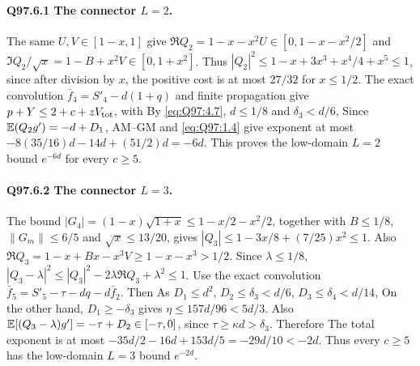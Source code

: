 \paragraph{Q97.6.1 The connector \(L=\allowbreak 2\).}
The same \(U,\allowbreak V\in[1-x,\allowbreak 1]\) give
\(\Re Q_2=\allowbreak 1-x-x^2U\in[0,\allowbreak 1-x-x^2/2]\) and
\(\Im Q_2/\sqrt x=\allowbreak 1-B+x^2V\in[0,\allowbreak 1+x^2]\).
Thus \(|Q_2|^2\le\allowbreak 1-x+3x^3+x^4/4+x^5\le\allowbreak 1\), since after division
by \(x\), the positive cost is at most \(27/32\) for \(x\le\allowbreak 1/2\).
The exact convolution \(\bar f_4=\allowbreak S'_4-d(1+q)\) and finite propagation
give \(p+Y\le\allowbreak 2+c+zV_{\rm tot}\), with
By \eqref{eq:Q97:4.7}, \(d\le\allowbreak 1/8\) and \(\delta_3<\allowbreak d/6\),
Since \(\mathbb E(Q_2g')=\allowbreak -d+D_1\),
AM--GM and \eqref{eq:Q97:1.4} give exponent at most
\(-8(35/16)d-14d+(51/2)d=\allowbreak -6d\).
This proves the low-domain \(L=\allowbreak 2\) bound \(e^{-6d}\) for every \(c\ge\allowbreak 5\).

\paragraph{Q97.6.2 The connector \(L=\allowbreak 3\).}
The bound \(|G_4|=\allowbreak (1-x)\sqrt{1+x}\le\allowbreak 1-x/2-x^2/2\), together with
\(B\le\allowbreak 1/8\), \(\|G_m\|\le\allowbreak 6/5\) and \(\sqrt x\le\allowbreak 13/20\), gives
\(|Q_3|\le\allowbreak 1-3x/8+(7/25)x^2\le\allowbreak 1\).
Also \(\Re Q_3=\allowbreak 1-x+Bx-x^3V\ge\allowbreak 1-x-x^3>\allowbreak 1/2\).
Since \(\lambda\le\allowbreak 1/8\),
\(|Q_3-\lambda|^2\le\allowbreak |Q_3|^2-2\lambda\Re Q_3+\lambda^2\le\allowbreak 1\).
Use the exact convolution
\(\bar f_5=\allowbreak S'_5-\tau-dq-d\bar f_2\). Then
As \(D_1\le\allowbreak  d^2\), \(D_2\le\allowbreak \delta_3<\allowbreak d/6\), \(D_3\le\allowbreak \delta_4<\allowbreak d/14\),
On the other hand, \(D_1\ge\allowbreak -\delta_3\) gives
\(\eta\le\allowbreak 157d/96<\allowbreak 5d/3\).
Also \(\mathbb E[(Q_3-\lambda)g']=\allowbreak -\tau+D_2\in[-\tau,\allowbreak 0]\), since
\(\tau\ge\allowbreak \kappa d>\allowbreak \delta_3\). Therefore
The total exponent is at most
\(-35d/2-16d+153d/5=\allowbreak -29d/10<\allowbreak -2d\).
Thus every \(c\ge\allowbreak 5\) has the low-domain \(L=\allowbreak 3\) bound \(e^{-2d}\).

